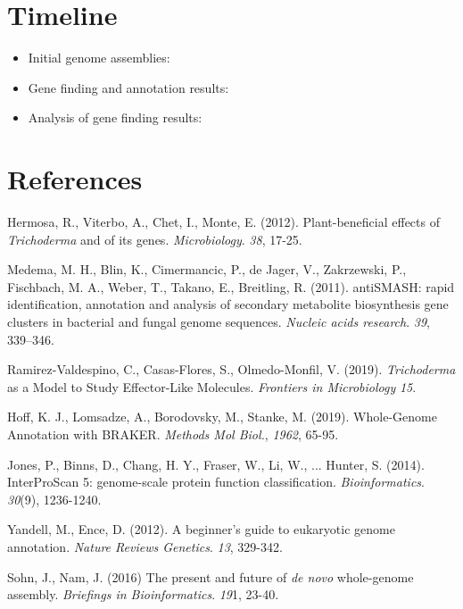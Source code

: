 \documentclass[12pt]{article}
\begin{document}
\section{Timeline}
\begin{itemize}
\item Initial genome assemblies: 
\item Gene finding and annotation results: 
\item Analysis of gene finding results: 
\end{itemize}

\section{References}

\begin{thebibliography}{99}
 Hermosa, R., Viterbo, A., Chet, I., Monte,
  E. (2012). Plant-beneficial effects of \textit{Trichoderma} and of
  its genes. \textit{Microbiology}. \textit{38},
  17-25. 

 Medema, M. H., Blin, K., Cimermancic, P., de
  Jager, V., Zakrzewski, P., Fischbach, M. A., Weber, T., Takano, E.,
  Breitling, R. (2011). antiSMASH: rapid identification, annotation
  and analysis of secondary metabolite biosynthesis gene clusters in
  bacterial and fungal genome sequences. \textit{Nucleic acids
    research}. \textit{39}, 339–346.

 Ramirez-Valdespino, C., Casas-Flores, S.,
  Olmedo-Monfil, V. (2019). \textit{Trichoderma} as a Model to Study
  Effector-Like Molecules. \textit{Frontiers in Microbiology} \textit{15}.

 Hoff, K. J., Lomsadze, A., Borodovsky, M., 
  Stanke, M. (2019). Whole-Genome Annotation with
  BRAKER. \textit{Methods Mol Biol.}, \textit{1962}, 65-95.

 Jones, P., Binns, D., Chang, H. Y., Fraser,
  W., Li, W., ... Hunter, S. (2014). InterProScan 5: genome-scale
  protein function
  classification. \textit{Bioinformatics}. \textit{30}(9),
  1236-1240.

 Yandell, M., Ence, D. (2012). A beginner's
  guide to eukaryotic genome annotation. \textit{Nature Reviews
    Genetics}. \textit{13}, 329-342.
  
 Sohn, J., Nam, J. (2016) The present and future of
  \textit{de novo} whole-genome assembly. \textit{Briefings in
    Bioinformatics}. \textit{19}1, 23-40.


\end{thebibliography}
\end{document}
